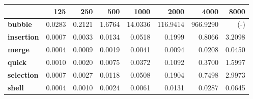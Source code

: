 \begin{tabular}{lrrrrrrr}
\toprule
{} &   125  &   250  &   500  &    1000 &     2000 &     4000 &   8000 \\
\midrule
\textbf{bubble   } & 0.0283 & 0.2121 & 1.6764 & 14.0336 & 116.9414 & 966.9290 &    (-) \\
\textbf{insertion} & 0.0007 & 0.0033 & 0.0134 &  0.0518 &   0.1999 &   0.8066 & 3.2098 \\
\textbf{merge    } & 0.0004 & 0.0009 & 0.0019 &  0.0041 &   0.0094 &   0.0208 & 0.0450 \\
\textbf{quick    } & 0.0010 & 0.0020 & 0.0075 &  0.0372 &   0.1092 &   0.3700 & 1.5997 \\
\textbf{selection} & 0.0007 & 0.0027 & 0.0118 &  0.0508 &   0.1904 &   0.7498 & 2.9973 \\
\textbf{shell    } & 0.0004 & 0.0010 & 0.0024 &  0.0061 &   0.0131 &   0.0287 & 0.0645 \\
\bottomrule
\end{tabular}
